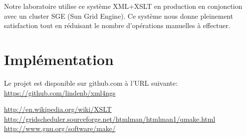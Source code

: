\documentclass[long, final]{jobim2013}
\begin{document}
Notre laboratoire utilise ce système XML+XSLT en production en conjonction avec un cluster SGE (Sun Grid Engine). Ce système nous donne pleinement satisfaction tout en réduisant le nombre d'opérations manuelles à effectuer.

\section{Implémentation} 
Le projet  est disponible sur github.com à l'URL suivante: \url{https://github.com/lindenb/xml4ngs}

\begin{thebibliography}{99}
   \url{http://en.wikipedia.org/wiki/XSLT}
   \url{http://gridscheduler.sourceforge.net/htmlman/htmlman1/qmake.html}
   \url{http://www.gnu.org/software/make/}

 \end{thebibliography}
\end{document}
